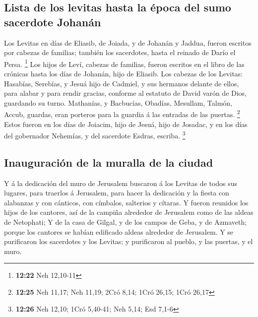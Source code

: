 \hypertarget{lista-de-los-levitas-hasta-la-uxe9poca-del-sumo-sacerdote-johanuxe1n}{%
\subsection{Lista de los levitas hasta la época del sumo sacerdote
Johanán}\label{lista-de-los-levitas-hasta-la-uxe9poca-del-sumo-sacerdote-johanuxe1n}}

 Los Levitas en días de Eliasib, de Joiada, y de Johanán
y Jaddua, fueron escritos por cabezas de familias; también los
sacerdotes, hasta el reinado de Darío el Persa. \footnote{\textbf{12:22}
  Neh 12,10-11}  Los hijos de Leví, cabezas de familias,
fueron escritos en el libro de las crónicas hasta los días de Johanán,
hijo de Eliasib.  Los cabezas de los Levitas: Hasabías,
Serebías, y Jesuá hijo de Cadmiel, y sus hermanos delante de ellos, para
alabar y para rendir gracias, conforme al estatuto de David varón de
Dios, guardando su turno.  Mathanías, y Bacbucías,
Obadías, Mesullam, Talmón, Accub, guardas, eran porteros para la guardia
á las entradas de las puertas. \footnote{\textbf{12:25} Neh 11,17; Neh
  11,19; 2Cró 8,14; 1Cró 26,15; 1Cró 26,17}  Estos fueron
en los días de Joiacim, hijo de Jesuá, hijo de Josadac, y en los días
del gobernador Nehemías, y del sacerdote Esdras, escriba. \footnote{\textbf{12:26}
  Neh 12,10; 1Cró 5,40-41; Neh 5,14; Esd 7,1-6}

\hypertarget{inauguraciuxf3n-de-la-muralla-de-la-ciudad}{%
\subsection{Inauguración de la muralla de la
ciudad}\label{inauguraciuxf3n-de-la-muralla-de-la-ciudad}}

 Y á la dedicación del muro de Jerusalem buscaron á los
Levitas de todos sus lugares, para traerlos á Jerusalem, para hacer la
dedicación y la fiesta con alabanzas y con cánticos, con címbalos,
salterios y cítaras.  Y fueron reunidos los hijos de los
cantores, así de la campiña alrededor de Jerusalem como de las aldeas de
Netophati;  Y de la casa de Gilgal, y de los campos de
Geba, y de Azmaveth; porque los cantores se habían edificado aldeas
alrededor de Jerusalem.  Y se purificaron los sacerdotes
y los Levitas; y purificaron al pueblo, y las puertas, y el muro.

